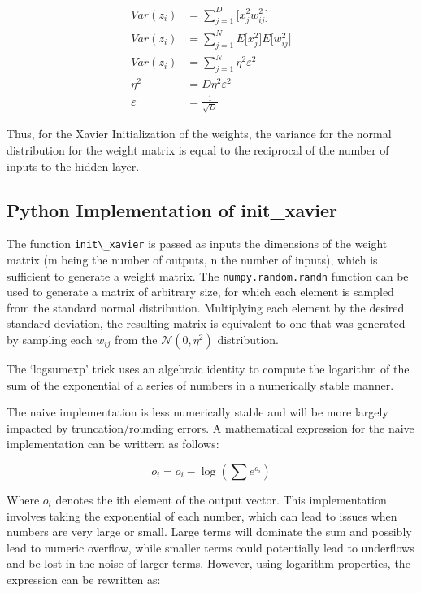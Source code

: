 \begin{align}
Var(z_i) &= \sum_{j=1}^{D} \Big[x_{j}^2 w_{ij}^2\Big] \\
Var(z_i) & = \sum_{j=1}^{N} E\Big[x_{j}^2\Big] E\Big[w_{ij}^2\Big] \\
Var(z_i) &= \sum_{j=1}^{N} \eta^2 \varepsilon^2 \\
\eta^2 &= D\eta^2 \varepsilon^2 \\
\varepsilon &= \frac{1}{\sqrt{D}}
\end{align}

Thus, for the Xavier Initialization of the weights, the variance for the normal distribution for the weight matrix is equal to the reciprocal of the number of inputs to the hidden layer.

\subsection{Python Implementation of init\_xavier}
The function \verb+init\_xavier+ is passed as inputs the dimensions of the weight matrix (m being the number of outputs, n the number of inputs), which is sufficient to generate a weight matrix. The \verb+numpy.random.randn+ function can be used to generate a matrix of arbitrary size, for which each element is sampled from the standard normal distribution. Multiplying each element by the desired standard deviation, the resulting matrix is equivalent to one that was generated by sampling each $w_{ij}$ from the $\mathcal{N}(0,\eta^2)$ distribution.

\newpage
{}
The `logsumexp' trick uses an algebraic identity to compute the logarithm of the sum of the exponential of a series of numbers in a numerically stable manner.

The naive implementation is less numerically stable and will be more largely impacted by truncation/rounding errors. A mathematical expression for the naive implementation can be writtern as follows:

\begin{equation}
o_i = o_i - \log(\sum e^{o_i})
\end{equation}

Where $o_i$ denotes the ith element of the output vector. This implementation involves taking the exponential of each number, which can lead to issues when numbers are very large or small. Large terms will dominate the sum and possibly lead to numeric overflow, while smaller terms could potentially lead to underflows and be lost in the noise of larger terms. However, using logarithm properties, the expression can be rewritten as:

